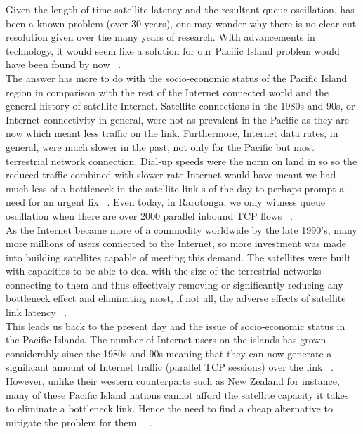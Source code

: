 Given the length of time satellite latency and the resultant queue oscillation, has been a known problem (over 30 years), one may wonder why there is no clear-cut resolution given over the many years of research. With advancements in technology, it would seem like a solution for our Pacific Island problem would have been found by now ~\cite{21}. \\

The answer has more to do with the socio-economic status of the Pacific Island region in comparison with the rest of the Internet connected world and the general history of satellite Internet. Satellite connections in the 1980s and 90s, or Internet connectivity in general, were not as prevalent in the Pacific as they are now which meant less traffic on the link. Furthermore, Internet data rates, in general, were much slower in the past, not only for the Pacific but most terrestrial network connection. Dial-up speeds were the norm on land in so so the reduced traffic combined with slower rate Internet would have meant we had much less of a bottleneck in the satellite link s of the day to perhaps prompt a need for an urgent fix ~\cite{21}. Even today, in Rarotonga, we only witness queue oscillation when there are over 2000 parallel inbound TCP flows ~\cite{4}. \\

As the Internet became more of a commodity worldwide by the late 1990's, many more millions of users connected to the Internet, so more investment was made into building satellites capable of meeting this demand. The satellites were built with capacities to be able to deal with the size of the terrestrial networks connecting to them and thus effectively removing or significantly reducing any bottleneck effect and eliminating most, if not all, the adverse effects of satellite link latency ~\cite{21}.\\

This leads us back to the present day and the issue of socio-economic status in the Pacific Islands. The number of Internet users on the islands has grown considerably since the 1980s and 90s meaning that they can now generate a significant amount of Internet traffic (parallel TCP sessions) over the link ~\cite{21}. However, unlike their western counterparts such as New Zealand for instance, many of these Pacific Island nations cannot afford the satellite capacity it takes to eliminate a bottleneck link. Hence the need to find a cheap alternative to mitigate the problem for them ~\cite{3}~\cite{4}. 

